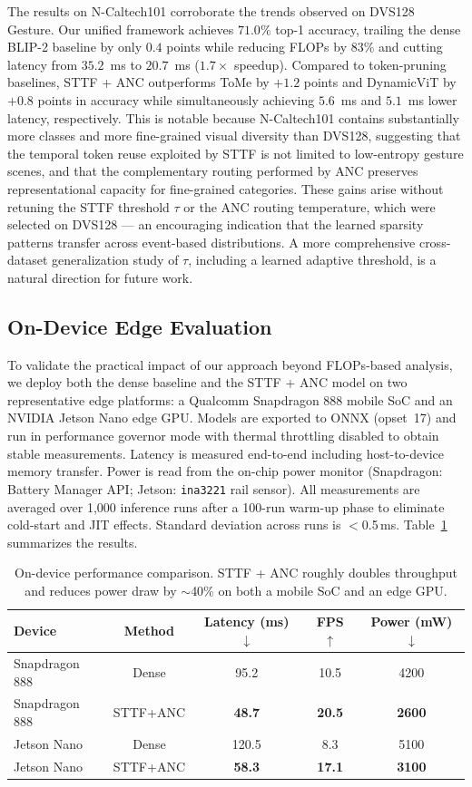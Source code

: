 \documentclass{article}
\begin{document}
The results on N-Caltech101 corroborate the trends observed on DVS128 Gesture. Our unified framework achieves $71.0\%$ top-1 accuracy, trailing the dense BLIP-2 baseline by only $0.4$ points while reducing FLOPs by $83\%$ and cutting latency from $35.2$~ms to $20.7$~ms ($1.7\times$ speedup). Compared to token-pruning baselines, STTF + ANC outperforms ToMe by $+1.2$ points and DynamicViT by $+0.8$ points in accuracy while simultaneously achieving $5.6$~ms and $5.1$~ms lower latency, respectively. This is notable because N-Caltech101 contains substantially more classes and more fine-grained visual diversity than DVS128, suggesting that the temporal token reuse exploited by STTF is not limited to low-entropy gesture scenes, and that the complementary routing performed by ANC preserves representational capacity for fine-grained categories. These gains arise without retuning the STTF threshold $\tau$ or the ANC routing temperature, which were selected on DVS128 — an encouraging indication that the learned sparsity patterns transfer across event-based distributions. A more comprehensive cross-dataset generalization study of $\tau$, including a learned adaptive threshold, is a natural direction for future work.

\subsection{On-Device Edge Evaluation}

To validate the practical impact of our approach beyond FLOPs-based analysis, we deploy both the dense baseline and the STTF + ANC model on two representative edge platforms: a Qualcomm Snapdragon 888 mobile SoC and an NVIDIA Jetson Nano edge GPU. Models are exported to ONNX (opset~17) and run in performance governor mode with thermal throttling disabled to obtain stable measurements. Latency is measured end-to-end including host-to-device memory transfer. Power is read from the on-chip power monitor (Snapdragon: Battery Manager API; Jetson: \texttt{ina3221} rail sensor). All measurements are averaged over 1{,}000 inference runs after a 100-run warm-up phase to eliminate cold-start and JIT effects. Standard deviation across runs is $<$0.5\,ms. Table~\ref{tab:ondevice} summarizes the results.

\begin{table}[htbp]
\centering
\caption{On-device performance comparison. STTF + ANC roughly doubles throughput and reduces power draw by $\sim$40\% on both a mobile SoC and an edge GPU.}
\label{tab:ondevice}
\begin{tabular}{lcccc}
\toprule
Device & Method & Latency (ms) $\downarrow$ & FPS $\uparrow$ & Power (mW) $\downarrow$ \\
\midrule
Snapdragon 888 & Dense & 95.2 & 10.5 & 4200 \\
Snapdragon 888 & STTF+ANC & \textbf{48.7} & \textbf{20.5} & \textbf{2600} \\
\midrule
Jetson Nano & Dense & 120.5 & 8.3 & 5100 \\
Jetson Nano & STTF+ANC & \textbf{58.3} & \textbf{17.1} & \textbf{3100} \\
\bottomrule
\end{tabular}
\end{table}
\end{document}
